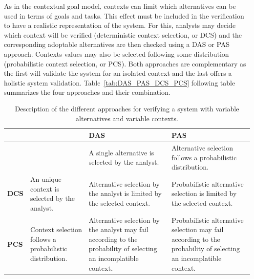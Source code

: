 As in the contextual goal model, contexts can limit which alternatives can be used in terms of goals and tasks. This effect must be included in the verification to have a realistic representation of the system. For this, analysts may decide which context will be verified (deterministic context selection, or DCS) and the corresponding adoptable alternatives are then checked using a DAS or PAS approach. Contexts values may also be selected following some distribution (probabilistic context selection, or PCS). Both approaches are complementary as the first will validate the system for an isolated context and the last offers a holistic system validation. Table~\ref{tab:DAS_PAS_DCS_PCS} following table summarizes the four approaches and their combination.

\begin{table}[h]
{\renewcommand{\arraystretch}{1.5}
\begin{tabularx}{\textwidth}{@{}l|XXX@{}}
\toprule
             &                                                         & \textbf{DAS}                                                                                                      & \textbf{PAS}                                                                                                     \\ \midrule
             &                                                         & A single alternative is selected by the analyst.                                                                  & Alternative selection follows a probabilistic distribution.                                                      \\
\textbf{DCS} & An unique context is selected by the analyst.           & Alternative selection by the analyst is limited by the selected context.                                          & Probabilistic alternative selection is limited by the selected context.                                          \\
\textbf{PCS} & Context selection follows a probabilistic distribution. & Alternative selection by the analyst may fail according to the probability of selecting an incomplatible context. & Probabilistic alternative selection may fail according to the probability of selecting an incomplatible context. \\ \bottomrule
\end{tabularx}
}
\caption{Description of the different approaches for verifying a system with variable alternatives and variable contexts.}
\end{table}

